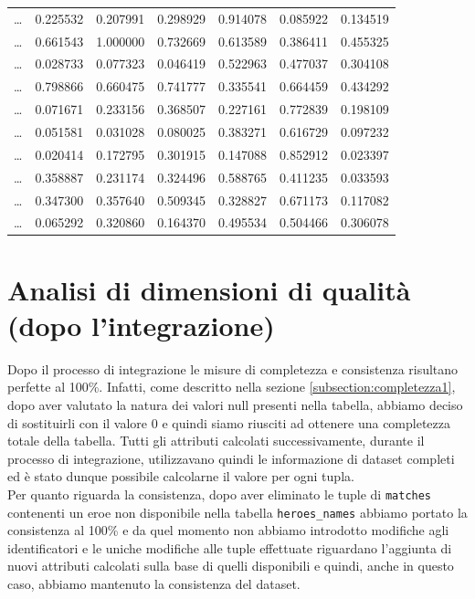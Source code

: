 \documentclass[a4paper,12pt,openany,oneside]{book}
\begin{document}
\begin{table}[H]
\begin{tabularx}{0.83\textwidth}{crrrrrr}
	    \midrule
	    \dots &     0.225532 &           0.207991 &         0.298929 & 0.914078 &  0.085922 & 0.134519 \\
	    \dots &     0.661543 &           1.000000 &         0.732669 & 0.613589 &  0.386411 & 0.455325 \\
	    \dots &     0.028733 &           0.077323 &         0.046419 & 0.522963 &  0.477037 & 0.304108 \\
	    \dots &     0.798866 &           0.660475 &         0.741777 & 0.335541 &  0.664459 & 0.434292 \\
	    \dots &     0.071671 &           0.233156 &         0.368507 & 0.227161 &  0.772839 & 0.198109 \\
	    \dots &     0.051581 &           0.031028 &         0.080025 & 0.383271 &  0.616729 & 0.097232 \\
	    \dots &     0.020414 &           0.172795 &         0.301915 & 0.147088 &  0.852912 & 0.023397 \\
	    \dots &     0.358887 &           0.231174 &         0.324496 & 0.588765 &  0.411235 & 0.033593 \\
	    \dots &     0.347300 &           0.357640 &         0.509345 & 0.328827 &  0.671173 & 0.117082 \\
	    \dots &     0.065292 &           0.320860 &         0.164370 & 0.495534 &  0.504466 & 0.306078 \\
	\end{tabularx}
	\label{table:heroes_stats_normalized}
\end{table}
\section{Analisi di dimensioni di qualità (dopo l'integrazione)}
Dopo il processo di integrazione le misure di completezza e consistenza risultano perfette al 100\%. Infatti, come descritto nella sezione \ref{subsection:completezza1}, dopo aver valutato la natura dei valori null presenti nella tabella, abbiamo deciso di sostituirli con il valore 0 e quindi siamo riusciti ad ottenere una completezza totale della tabella. Tutti gli attributi calcolati successivamente, durante il processo di integrazione, utilizzavano quindi le informazione di dataset completi ed è stato dunque possibile calcolarne il valore per ogni tupla.
\\
Per quanto riguarda la consistenza, dopo aver eliminato le tuple di \verb|matches| contenenti un eroe non disponibile nella tabella \verb|heroes_names| abbiamo portato la consistenza al 100\% e da quel momento non abbiamo introdotto modifiche agli identificatori e le uniche modifiche alle tuple effettuate riguardano l'aggiunta di nuovi attributi calcolati sulla base di quelli disponibili e quindi, anche in questo caso, abbiamo mantenuto la consistenza del dataset.
\end{document}
